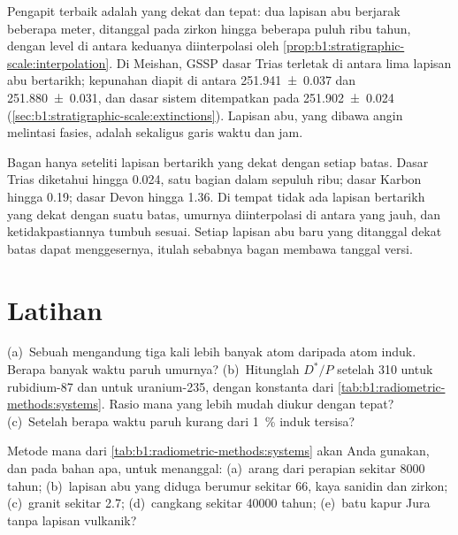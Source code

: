 Pengapit terbaik adalah yang dekat dan tepat: dua lapisan abu berjarak beberapa meter, ditanggal pada zirkon hingga beberapa puluh ribu tahun, dengan level di antara keduanya diinterpolasi oleh \cref{prop:b1:stratigraphic-scale:interpolation}. Di Meishan, GSSP dasar Trias terletak di antara lima lapisan abu bertarikh; kepunahan diapit di antara
\qty[uncertainty-mode=separate]{251.941(37)}{\Ma}
dan \qty[uncertainty-mode=separate]{251.880(31)}{\Ma}, dan dasar sistem ditempatkan pada
\qty[uncertainty-mode=separate]{251.902(24)}{\Ma}
(\cref{sec:b1:stratigraphic-scale:extinctions}). Lapisan abu, yang dibawa angin melintasi fasies, adalah sekaligus garis waktu dan jam.

Bagan hanya seteliti lapisan bertarikh yang dekat dengan setiap batas. Dasar Trias diketahui hingga \qty{0.024}{\Ma}, satu bagian dalam sepuluh ribu; dasar Karbon hingga \qty{0.19}{\Ma}; dasar Devon hingga \qty{1.36}{\Ma}. Di tempat tidak ada lapisan bertarikh yang dekat dengan suatu batas, umurnya diinterpolasi di antara yang jauh, dan ketidakpastiannya tumbuh sesuai.
Setiap lapisan abu baru yang ditanggal dekat batas dapat menggesernya, itulah sebabnya bagan membawa
tanggal versi.

\section{Latihan}

\begin{exercise}[$\star$]\label{exo:b1:radiometric-methods:1}
(a)~Sebuah  mengandung tiga kali lebih banyak atom  daripada atom induk. Berapa banyak waktu paruh umurnya? (b)~Hitunglah $D^*/P$ setelah
\qty{310}{\Ma} untuk rubidium-87 dan untuk uranium-235, dengan konstanta dari
\cref{tab:b1:radiometric-methods:systems}. Rasio mana yang lebih mudah diukur dengan tepat? (c)~Setelah berapa waktu paruh kurang dari \qty{1}{\percent} induk tersisa?
\end{exercise}

\begin{exercise}[$\star$]\label{exo:b1:radiometric-methods:2}
Metode mana dari \cref{tab:b1:radiometric-methods:systems} akan Anda gunakan, dan pada bahan apa, untuk menanggal: (a)~arang dari perapian sekitar \num{8000} tahun; (b)~lapisan abu yang diduga berumur sekitar \qty{66}{\Ma}, kaya sanidin dan zirkon; (c)~granit sekitar \qty{2.7}{\Ga}; (d)~cangkang sekitar \num{40000} tahun; (e)~batu kapur Jura tanpa lapisan vulkanik?
\end{exercise}

